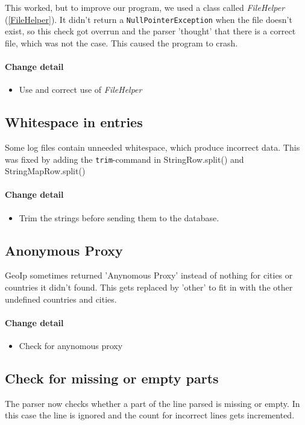 This worked, but to improve our program, we used a class called \textit{FileHelper} (\ref{FileHelper}). 
It didn't return a \texttt{NullPointerException} when the file doesn't exist, 
so this check got overrun and the parser 'thought' that there is a correct file, which was not the case.
This caused the program to crash. 

\paragraph{Change detail}
\begin{itemize}
  \item Use and correct use of \textit{FileHelper}
\end{itemize}

\subsection{Whitespace in entries}
Some log files contain unneeded whitespace, which produce incorrect data. 
This was fixed by adding the \texttt{trim}-command in StringRow.split() and StringMapRow.split()

\paragraph{Change detail}
\begin{itemize}
  \item Trim the strings before sending them to the database.
\end{itemize}

\subsection{Anonymous Proxy}
GeoIp sometimes returned 'Anynomous Proxy' instead of nothing for cities or countries it didn't found.
This gets replaced by 'other' to fit in with the other undefined countries and cities.


\paragraph{Change detail}
\begin{itemize}
  \item Check for anynomous proxy
\end{itemize}

\subsection{Check for missing or empty parts}
The parser now checks whether a part of the line parsed is missing or empty. In this case the line is ignored and 
the count for incorrect lines gets incremented.

